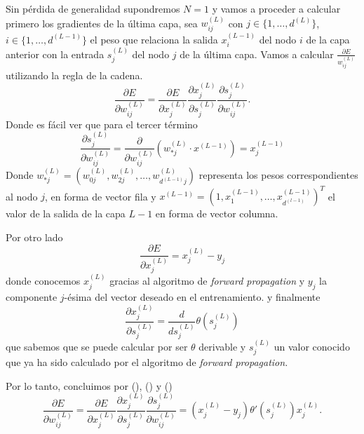 Sin pérdida de generalidad supondremos $N=1$ y vamos a proceder a calcular primero los gradientes de la última capa, 
sea $w^{(L)}_{i j}$  con $j \in \{1, \ldots , d^{(L)}\}$, 
$i \in \{1, \ldots , d^{(L-1)}\}$  el peso que relaciona la salida 
$x_i ^{(L-1)}$ del  
nodo $i$ de la capa anterior con la entrada $s_j ^{(L)}$ del nodo $j$ de la última capa. 
Vamos a calcular $\frac{\partial E}{ w^{(L)}_{i j}}$ utilizando la regla de la cadena. 
\begin{equation}
    \frac{\partial{E}}{\partial w^{(L)}_{i j}}
     = 
     \frac{\partial{E}}{\partial x^{(L)}_j} 
     \frac{\partial x^{(L)}_j}{\partial s^{(L)}_j} 
     \frac{\partial s^{(L)}_j}{\partial w^{(L)}_{i j}}.
\end{equation}
Donde es fácil ver que para el tercer término
\begin{equation}\label{eq:backpropagation_s_última_capa_derivada}
    \frac{\partial s^{(L)}_{j}}{\partial w^{(L)}_{i j}}
    = 
    \frac{\partial }{\partial w^{(L)}_{i j}}
    \left(
        w^{(L)}_{\ast j } \cdot x^{(L-1)}
    \right)
    = 
    x^{(L-1)}_j
\end{equation}
Donde $w^{(L)}_{\ast j} = \left(w^{(L)}_{0 j}, w^{(L)}_{2 j}, \ldots, w^{(L)}_{d^{(L-1)} j}\right)$ representa los pesos correspondientes al nodo $j$,
 en forma de  vector fila y $x^{(L-1)} = \left(1, x ^{(L-1)}_1, \ldots, x ^{(L-1)}_{d^{(l-1)}}\right)^T$ el valor de la salida de la capa $L-1$
 en forma de vector columna.
 
 Por otro lado 
 \begin{equation}\label{eq:backpropagation_E_última_capa_derivada}
    \frac{\partial{E}}{\partial x^{(L)}_j} =
    x^{(L)}_j - y_j
 \end{equation}
 donde conocemos $x^{(L)}_j$ gracias al algoritmo de \textit{forward propagation}
 y $y_j$ la componente $j$-ésima del vector deseado en el entrenamiento.
y finalmente
\begin{equation}\label{eq:backpropagation_x_última_capa_derivada}
    \frac{\partial x^{(L)}_j}{\partial s^{(L)}_j} 
    = 
    \frac{d}{d s^{(L)}_j} 
        \theta \left( 
            s^{(L)}_j
        \right)
\end{equation}
que sabemos que se puede calcular por ser $\theta$ derivable y 
$s^{(L)}_j$ un valor conocido que ya ha sido calculado por el algoritmo de 
\textit{forward propagation.}

Por lo tanto, concluimos por 
(),
()
y  
()
\begin{equation}
    \frac{\partial{E}}{\partial w^{(L)}_{i j}}
     = 
     \frac{\partial{E}}{\partial x^{(L)}_j} 
     \frac{\partial x^{(L)}_j}{\partial s^{(L)}_j} 
     \frac{\partial s^{(L)}_j}{\partial w^{(L)}_{i j}} 
    =
    \left( x^{(L)}_j - y_j \right) 
    \theta' \left( s^{(L)}_j\right)
    x^{(L)}_j.
\end{equation}

